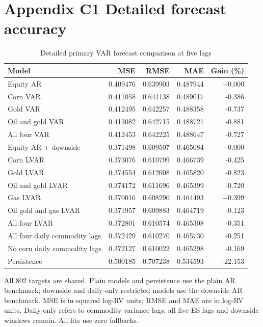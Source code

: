 \documentclass[11pt,letterpaper]{article}
\newcommand{\appendixpage}[2]{\clearpage\section*{#1}\label{#2}}
\begin{document}
\appendixpage{Appendix C1 Detailed forecast accuracy}{app:accuracy}
\setcounter{table}{0}
\setcounter{figure}{0}
\begin{table}[H]
\centering
\caption{Detailed primary VAR forecast comparison at five lags}\label{tab:completeaccuracy}
\footnotesize
\begin{tabular}{p{2.8in}rrrr}
\toprule
Model & MSE & RMSE & MAE & Gain (\%) \\
\midrule
Equity AR & 0.409476 & 0.639903 & 0.487944 & +0.000 \\
Corn VAR & 0.411058 & 0.641138 & 0.489017 & -0.386 \\
Gold VAR & 0.412495 & 0.642257 & 0.488358 & -0.737 \\
Oil and gold VAR & 0.413082 & 0.642715 & 0.488721 & -0.881 \\
All four VAR & 0.412453 & 0.642225 & 0.488647 & -0.727 \\
\addlinespace
Equity AR + downside & 0.371498 & 0.609507 & 0.465084 & +0.000 \\
Corn LVAR & 0.373076 & 0.610799 & 0.466739 & -0.425 \\
Gold LVAR & 0.374554 & 0.612008 & 0.465820 & -0.823 \\
Oil and gold LVAR & 0.374172 & 0.611696 & 0.465399 & -0.720 \\
Gas LVAR & 0.370016 & 0.608290 & 0.464493 & +0.399 \\
Oil gold and gas LVAR & 0.371957 & 0.609883 & 0.464719 & -0.123 \\
All four LVAR & 0.372801 & 0.610574 & 0.465308 & -0.351 \\
All four daily commodity lags & 0.372429 & 0.610270 & 0.465730 & -0.251 \\
No corn daily commodity lags & 0.372127 & 0.610022 & 0.465298 & -0.169 \\
Persistence & 0.500185 & 0.707238 & 0.534593 & -22.153 \\
\bottomrule
\end{tabular}
\end{table}
{\footnotesize All 802 targets are shared. Plain models and persistence use the plain AR benchmark; downside and daily-only restricted models use the downside AR benchmark. MSE is in squared log-RV units; RMSE and MAE are in log-RV units. Daily-only refers to commodity variance lags; all five ES lags and downside windows remain. All fits use zero fallbacks.\par}
\end{document}

